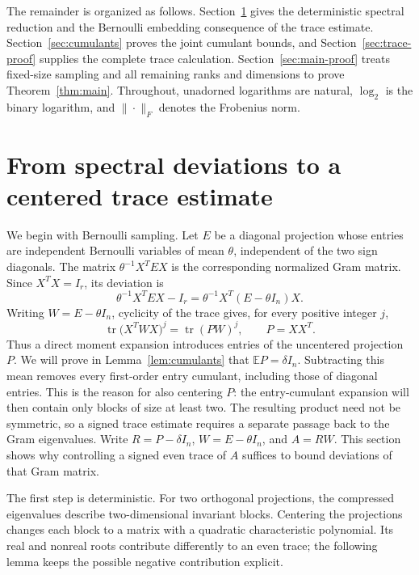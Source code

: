 \documentclass[11pt]{article}
\theoremstyle{definition}
\theoremstyle{remark}
\theoremstyle{plain}
\newcommand{\E}{\mathbb E}
\DeclareMathOperator{\tr}{tr}
\begin{document}
The remainder is organized as follows.  Section~\ref{sec:reduction} gives the deterministic spectral reduction
and the Bernoulli embedding consequence of the trace estimate.
Section~\ref{sec:cumulants} proves the joint cumulant bounds, and
Section~\ref{sec:trace-proof} supplies the complete trace calculation.
Section~\ref{sec:main-proof} treats fixed-size sampling and all
remaining ranks and dimensions to prove Theorem~\ref{thm:main}.
Throughout, unadorned logarithms are natural, $\log_2$ is the binary
logarithm, and $\|\cdot\|_F$ denotes the Frobenius norm.

\section{From spectral deviations to a centered trace estimate}
\label{sec:reduction}

We begin with Bernoulli sampling. Let $E$ be a diagonal projection
whose entries are independent Bernoulli variables of mean $\theta$,
independent of the two sign diagonals. The matrix
$\theta^{-1}X^TEX$ is the corresponding normalized Gram matrix.
Since $X^TX=I_r$, its deviation is
\begin{equation}\label{eq:gram-centering}
 \theta^{-1}X^TEX-I_r
       =\theta^{-1}X^T(E-\theta I_n)X.
\end{equation}
Writing $W=E-\theta I_n$, cyclicity of the trace gives, for every
positive integer $j$,
\[
 \tr\bigl(X^TWX\bigr)^j=\tr(PW)^j,\qquad P=XX^T.
\]
Thus a direct moment expansion introduces entries of the
uncentered projection $P$. We will prove in
Lemma~\ref{lem:cumulants} that $\E P=\delta I_n$.
Subtracting this mean removes every first-order entry cumulant,
including those of diagonal entries. This is the reason for also
centering $P$: the entry-cumulant expansion will then contain only
blocks of size at least two. The resulting product need not be
symmetric, so a signed trace estimate requires a separate passage
back to the Gram eigenvalues.
Write $R=P-\delta I_n$, $W=E-\theta I_n$, and $A=RW$.
This section shows why controlling a signed even trace of $A$
suffices to bound deviations of that Gram matrix.

The first step is deterministic. For two orthogonal projections,
the compressed eigenvalues describe two-dimensional invariant
blocks. Centering the projections changes each block to a matrix
with a quadratic characteristic polynomial. Its real and nonreal
roots contribute differently to an even trace; the following lemma
keeps the possible negative contribution explicit.
\end{document}
